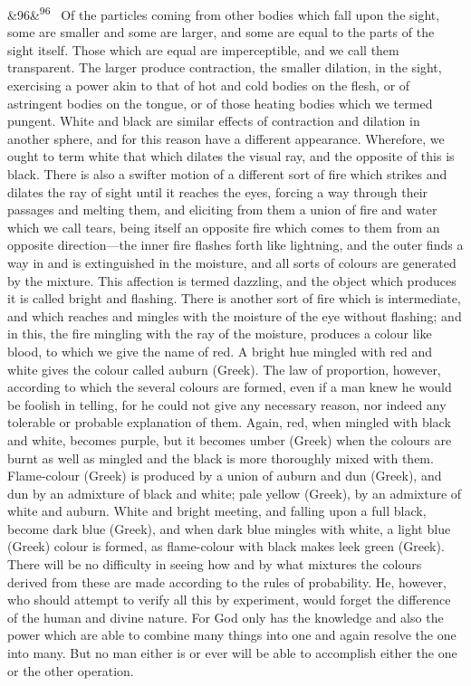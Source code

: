 \documentclass[12pt]{article}
\newcommand{\para}[1][]{\par\noindent\ifx&#1&\else\textsuperscript{\footnotesize #1}~\fi}
\begin{document}
\para[96] Of the particles coming from other bodies which fall upon the sight, some are smaller and some are larger, and some are equal to the parts of the sight itself. Those which are equal are imperceptible, and we call them transparent. The larger produce contraction, the smaller dilation, in the sight, exercising a power akin to that of hot and cold bodies on the flesh, or of astringent bodies on the tongue, or of those heating bodies which we termed pungent. White and black are similar effects of contraction and dilation in another sphere, and for this reason have a different appearance. Wherefore, we ought to term white that which dilates the visual ray, and the opposite of this is black. There is also a swifter motion of a different sort of fire which strikes and dilates the ray of sight until it reaches the eyes, forcing a way through their passages and melting them, and eliciting from them a union of fire and water which we call tears, being itself an opposite fire which comes to them from an opposite direction---the inner fire flashes forth like lightning, and the outer finds a way in and is extinguished in the moisture, and all sorts of colours are generated by the mixture. This affection is termed dazzling, and the object which produces it is called bright and flashing. There is another sort of fire which is intermediate, and which reaches and mingles with the moisture of the eye without flashing; and in this, the fire mingling with the ray of the moisture, produces a colour like blood, to which we give the name of red. A bright hue mingled with red and white gives the colour called auburn (Greek). The law of proportion, however, according to which the several colours are formed, even if a man knew he would be foolish in telling, for he could not give any necessary reason, nor indeed any tolerable or probable explanation of them. Again, red, when mingled with black and white, becomes purple, but it becomes umber (Greek) when the colours are burnt as well as mingled and the black is more thoroughly mixed with them. Flame-colour (Greek) is produced by a union of auburn and dun (Greek), and dun by an admixture of black and white; pale yellow (Greek), by an admixture of white and auburn. White and bright meeting, and falling upon a full black, become dark blue (Greek), and when dark blue mingles with white, a light blue (Greek) colour is formed, as flame-colour with black makes leek green (Greek). There will be no difficulty in seeing how and by what mixtures the colours derived from these are made according to the rules of probability. He, however, who should attempt to verify all this by experiment, would forget the difference of the human and divine nature. For God only has the knowledge and also the power which are able to combine many things into one and again resolve the one into many. But no man either is or ever will be able to accomplish either the one or the other operation.
\end{document}
